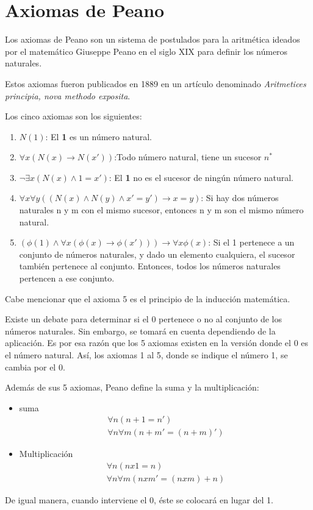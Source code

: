 \section{Axiomas de Peano}\label{sect: Axiomas de Peano}
Los axiomas de Peano son un sistema de postulados para la aritmética ideados por el matem\'atico Giuseppe Peano en el siglo XIX para definir los n\'umeros naturales.

Estos axiomas fueron publicados en 1889 en un art\'iculo denominado \textit{Aritmetices principia, nova methodo exposita}.

Los cinco axiomas son los siguientes:
\begin{enumerate}
	\item $N(1)$: El \textbf{1} es un n\'umero natural.
	\item $\forall x(N(x)\to N(x'))$:Todo n\'umero natural, tiene un sucesor \textbf{$n^*$}
	\item $\neg \exists x(N(x)\land 1=x')$: El \textbf{1} no es el sucesor de ning\'un n\'umero natural.
	\item $\forall x \forall y ((N(x)\land N(y)\land x'=y')\to x=y)$: Si hay dos n\'umeros naturales n y m con el mismo sucesor, entonces n y m son el mismo n\'umero natural.
	\item $\left(\phi(1)\land \forall x(\phi(x)\to \phi(x'))\right) \to \forall x \phi(x)$: Si el 1 pertenece a un conjunto de n\'umeros naturales, y dado un elemento cualquiera, el sucesor tambi\'en pertenece al conjunto. Entonces, todos los n\'umeros naturales pertencen a ese conjunto.
\end{enumerate}

Cabe mencionar que el axioma 5 es el principio de la inducci\'on matem\'atica.

Existe un debate para determinar si el $0$ pertenece o no al conjunto de los n\'umeros naturales. Sin embargo, se tomar\'a en cuenta dependiendo de la aplicaci\'on. Es por esa raz\'on que los 5 axiomas existen en la versi\'on donde el $0$ es el n\'umero natural. As\'i, los axiomas 1 al 5, donde se indique el n\'umero 1, se cambia por el 0.

Adem\'as de sus 5 axiomas, Peano define la suma y la multiplicaci\'on:
\begin{itemize}
	\item suma
	\begin{eqnarray*}
		\forall n(n+1=n')\\
		\forall n\forall m(n+m'=(n+m)')
	\end{eqnarray*}
	\item Multiplicaci\'on
	\begin{eqnarray*}
		\forall n(nx1=n)\\
		\forall n \forall m(nxm'=(nxm)+n)
	\end{eqnarray*}
\end{itemize}
De igual manera, cuando interviene el 0, \'este se colocar\'a en lugar del 1.
